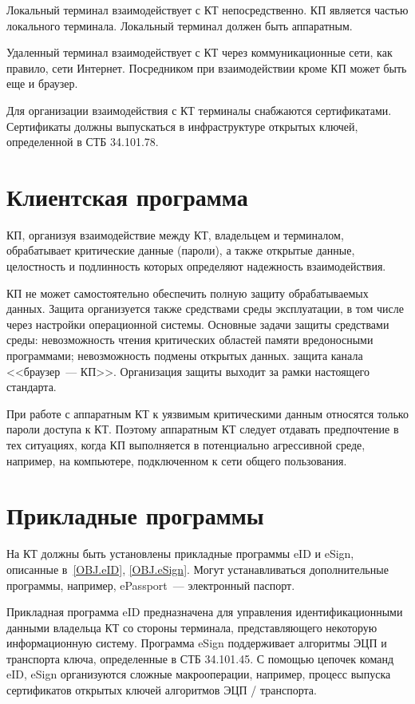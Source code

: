 Локальный терминал взаимодействует с КТ непосредственно. КП является 
частью локального терминала. Локальный терминал должен быть аппаратным.

Удаленный терминал взаимодействует с КТ через коммуникационные сети,
как правило, сети Интернет. Посредником при взаимодействии 
кроме КП может быть еще и браузер. 

Для организации взаимодействия с КТ терминалы снабжаются сертификатами.
Сертификаты должны выпускаться в инфраструктуре открытых ключей, 
определенной в СТБ 34.101.78.

\section{Клиентская программа}

КП, организуя взаимодействие между КТ, владельцем и терминалом,
обрабатывает критические данные (пароли), а также открытые данные, 
целостность и подлинность которых определяют надежность  
взаимодействия.

КП не может самостоятельно 
обеспечить полную защиту обрабатываемых данных. 
Защита организуется также средствами среды эксплуатации, 
в том числе через настройки операционной системы.  
%
Основные задачи защиты средствами среды: 
невозможность чтения критических областей памяти вредоносными программами; 
невозможность подмены открытых данных.
защита канала <<браузер~--- КП>>.
%
Организация защиты выходит за рамки настоящего стандарта.

При работе с аппаратным КТ к уязвимым критическими данным
относятся только пароли доступа к КТ. Поэтому аппаратным КТ следует отдавать 
предпочтение в тех ситуациях, когда КП выполняется в потенциально агрессивной 
среде, например, на компьютере, подключенном к сети общего пользования.


\section{Прикладные программы} 

На КТ должны быть установлены прикладные программы eID и eSign,
описанные в~\ref{OBJ.eID}, \ref{OBJ.eSign}. Могут устанавливаться 
дополнительные программы, например, ePassport~--- электронный 
паспорт.

Прикладная программа eID предназначена для управления идентификационными
данными владельца КТ со стороны терминала, представляющего некоторую 
информационную систему. 
%
Программа eSign поддерживает алгоритмы ЭЦП и транспорта ключа,
определенные в СТБ 34.101.45. С помощью цепочек команд eID, eSign
организуются сложные макрооперации, например, 
процесс выпуска сертификатов открытых ключей алгоритмов ЭЦП / транспорта.

